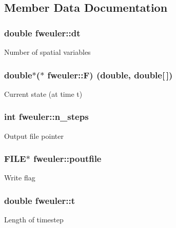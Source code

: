 \subsection{Member Data Documentation}
\hypertarget{structfweuler_aaaa8f46ce07dde8c2f1d3fbb0097d166}{}
\subsubsection[{dt}]{\setlength{\rightskip}{0pt plus 5cm}double fweuler\+::dt}\label{structfweuler_aaaa8f46ce07dde8c2f1d3fbb0097d166}
Number of spatial variables \hypertarget{structfweuler_aa4e9973fa09e3f186f5bf3e0c7ae2c2e}{}
\subsubsection[{F}]{\setlength{\rightskip}{0pt plus 5cm}double$\ast$($\ast$ fweuler\+::\+F) (double, double\mbox{[}$\,$\mbox{]})}\label{structfweuler_aa4e9973fa09e3f186f5bf3e0c7ae2c2e}
Current state (at time t) \hypertarget{structfweuler_a3ed5377d7609cbeef32422ad5662ab62}{}
\subsubsection[{n\+\_\+steps}]{\setlength{\rightskip}{0pt plus 5cm}int fweuler\+::n\+\_\+steps}\label{structfweuler_a3ed5377d7609cbeef32422ad5662ab62}
Output file pointer \hypertarget{structfweuler_ad2d6e50980d4a77a79652527c36d03ab}{}
\subsubsection[{poutfile}]{\setlength{\rightskip}{0pt plus 5cm}F\+I\+L\+E$\ast$ fweuler\+::poutfile}\label{structfweuler_ad2d6e50980d4a77a79652527c36d03ab}
Write flag \hypertarget{structfweuler_ab00dd0addf40e99c6abe9e65f5e140d5}{}
\subsubsection[{t}]{\setlength{\rightskip}{0pt plus 5cm}double fweuler\+::t}\label{structfweuler_ab00dd0addf40e99c6abe9e65f5e140d5}
Length of timestep \hypertarget{structfweuler_a24bbdf908ad0e3997194b2f9901a93e4}{}
